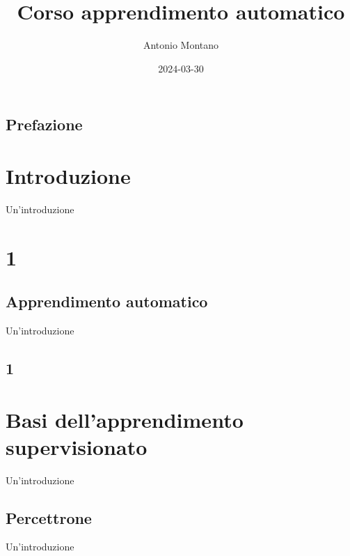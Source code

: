 \documentclass[
  letterpaper,
  DIV=11,
  numbers=noendperiod]{scrreprt}
\title{Corso apprendimento automatico}
\author{Antonio Montano}
\date{2024-03-30}
\renewcommand*\contentsname{Table of contents}
\newcommand\contentsname{Table of contents}
\begin{document}
\maketitle

\renewcommand*\contentsname{Table of contents}
{
\hypersetup{linkcolor=}
\setcounter{tocdepth}{2}
\tableofcontents
}

\chapter*{Prefazione}\label{prefazione}


\part{Introduzione}

Un'introduzione

\hfill\break

\part{1}

\chapter{Apprendimento automatico}\label{apprendimento-automatico}

Un'introduzione

\hfill\break

\chapter{1}\label{section-1}

\part{Basi dell'apprendimento supervisionato}

Un'introduzione

\hfill\break

\chapter{Percettrone}\label{percettrone}

Un'introduzione

\hfill\break
\end{document}
